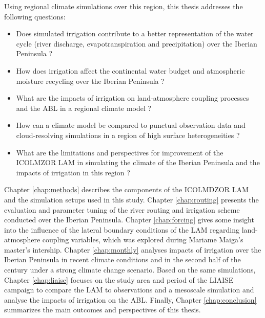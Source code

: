 \hfill

Using regional climate simulations over this region, this thesis addresses the following questions:

\begin{itemize}
    \item Does simulated irrigation contribute to a better representation of the water cycle (river discharge, evapotranspiration and precipitation) over the Iberian Peninsula ?
    \item How does irrigation affect the continental water budget and atmospheric moisture recycling over the Iberian Peninsula ?
    \item What are the impacts of irrigation on land-atmosphere coupling processes and the ABL in a regional climate model ?
    \item How can a climate model be compared to punctual observation data and cloud-resolving simulations in a region of high surface heterogeneities ?
    \item What are the limitations and perspectives for improvement of the ICOLMZOR LAM in simulating the climate of the Iberian Peninsula and the impacts of irrigation in this region ? 
\end{itemize}

Chapter \ref{chap:methods} describes the components of the ICOLMDZOR LAM and the simulation setups used in this study. 
Chapter \ref{chap:routing} presents the evaluation and parameter tuning of the river routing and irrigation scheme conducted over the Iberian Peninsula.
Chapter \ref{chap:forcing} gives some insight into the influence of the lateral boundary conditions of the LAM regarding land-atmosphere coupling variables, which was explored during Mariame Maiga's master's intership. 
Chapter \ref{chap:monthly} analyses impacts of irrigation over the Iberian Peninsula in recent climate conditions and in the second half of the century under a strong climate change scenario. 
Based on the same simulations, Chapter \ref{chap:liaise} focuses on the study area and period of the LIAISE campaign to compare the LAM to observations and a mesoscale simulation and analyse the impacts of irrigation on the ABL.
Finally, Chapter \ref{chap:conclusion} summarizes the main outcomes and perspectives of this thesis.


